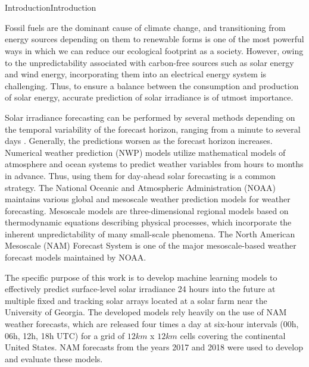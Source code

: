\chapter{}{Introduction}{Introduction}
\par Fossil fuels are the dominant cause of climate change, and transitioning from energy sources depending on them to renewable forms is one of the most powerful ways in which we can reduce our ecological footprint as a society. However, owing to the unpredictability associated with carbon-free sources such as solar energy and wind energy, incorporating them into an electrical energy system is challenging. Thus, to ensure a balance between the consumption and production of solar energy, accurate prediction of solar irradiance is of utmost importance.

\par Solar irradiance forecasting can be performed by several methods depending on the temporal variability of the forecast horizon, ranging from a minute to several days \cite{multimodel_figure1}. Generally, the predictions worsen as the forecast horizon increases. Numerical weather prediction (NWP) models utilize mathematical models of atmosphere and ocean systems to predict weather variables from hours to months in advance. Thus, using them for day-ahead solar forecasting is a common strategy. The National Oceanic and Atmospheric Administration (NOAA) maintains various global and mesoscale weather prediction models for weather forecasting. Mesoscale models are three-dimensional regional models based on thermodynamic equations describing physical processes, which incorporate the inherent unpredictability of many small-scale phenomena. The North American Mesoscale (NAM) Forecast System \cite{litrev_nwp_nam} is one of the major mesoscale-based weather forecast models maintained by NOAA.

\par The specific purpose of this work is to develop machine learning models to effectively predict surface-level solar irradiance 24 hours into the future at multiple fixed and tracking solar arrays located at a solar farm near the University of Georgia. The developed models rely heavily on the use of NAM weather forecasts, which are released four times a day at six-hour intervals (00h, 06h, 12h, 18h UTC) for a grid of $12km$ x $12km$ cells covering the continental United States. NAM forecasts from the years 2017 and 2018 were used to develop and evaluate these models. 

